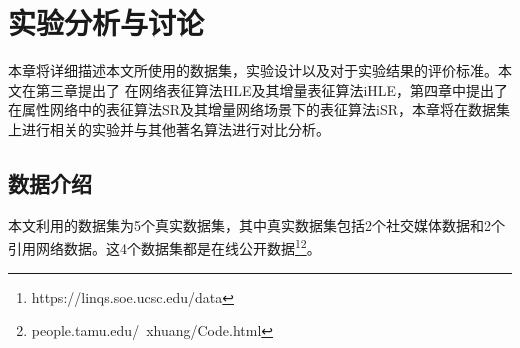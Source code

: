 \chapter{实验分析与讨论}
本章将详细描述本文所使用的数据集，实验设计以及对于实验结果的评价标准。本文在第三章提出了
在网络表征算法HLE及其增量表征算法iHLE，第四章中提出了在属性网络中的表征算法SR及其增量网络场景下的表征算法iSR，本章将在数据集上进行相关的实验并与其他著名算法进行对比分析。

\section{数据介绍}
本文利用的数据集为5个真实数据集，其中真实数据集包括2个社交媒体数据和2个引用网络数据。这4个数据集都是在线公开数据\footnote{https://linqs.soe.ucsc.edu/data}\footnote{people.tamu.edu/~xhuang/Code.html}。
